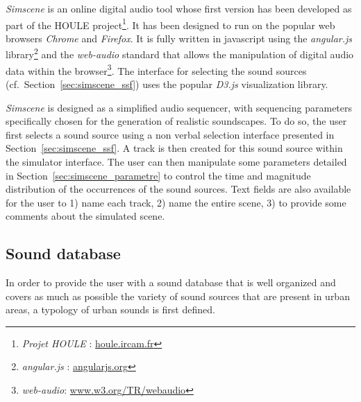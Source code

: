 \documentclass[12pt]{elsarticle}
\newcommand{\cf}{cf.}
\begin{document}
\emph{Simscene} is an online digital audio tool whose first version has been developed as part of the HOULE project\footnote{\emph{Projet HOULE} : \url{houle.ircam.fr}}. It has been designed to run on the popular web browsers \emph{Chrome} and \emph{Firefox}. It is fully written in javascript using the \emph{angular.js} library\footnote{\emph{angular.js} : \url{angularjs.org}} and the \emph{web-audio} standard that allows the manipulation of digital audio data within the browser\footnote{\emph{web-audio}: \url{www.w3.org/TR/webaudio}}. The interface for selecting the sound sources (\cf~Section~\ref{sec:simscene_ssf}) uses the popular \emph{D3.js} \cite{d32011} visualization library.


\emph{Simscene} is designed as a simplified audio sequencer, with sequencing parameters specifically chosen for the generation of realistic soundscapes. To do so, the user first selects a sound source using a non verbal selection interface presented in Section~\ref{sec:simscene_ssf}. A track is then created for this sound source within the simulator interface. The user can then manipulate some parameters detailed in Section~\ref{sec:simscene_parametre} to control the time and magnitude distribution of the occurrences of the sound sources. Text fields are also available for the user to 1) name each track, 2) name the entire scene, 3) to provide some comments about the simulated scene.

\subsection{Sound database}
\label{sec:simscene_sampleDataSet}


In order to provide the user with a sound database that is well organized and covers as much as possible the variety of sound sources that are present in urban areas, a typology of urban sounds is first defined.
\end{document}
